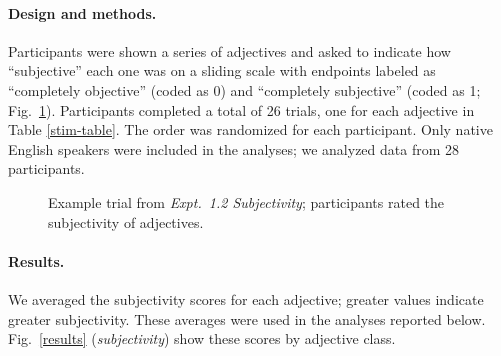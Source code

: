 \documentclass[12pt]{article}
\begin{document}
\paragraph{Design and methods.} Participants were shown a series of adjectives and asked to indicate how ``subjective'' each one was on a sliding scale with endpoints labeled as ``completely objective'' (coded as 0) and ``completely subjective'' (coded as 1; Fig.~\ref{subjectivity-trial}). 
Participants completed a total of 26 trials, one for each adjective in Table \ref{stim-table}. The order was randomized for each participant. Only native English speakers 
 were included in the analyses; we analyzed data from 28 participants.

\begin{figure}[tbh]
	\centering
	\caption{Example trial from \emph{Expt.\ 1.2 Subjectivity}; participants rated the subjectivity of adjectives.}\label{subjectivity-trial}
\end{figure}

\paragraph{Results.} We averaged the subjectivity scores for each adjective; greater values indicate greater subjectivity. These averages were used in the analyses reported below. Fig.\ \ref{results} (\emph{subjectivity}) show these scores by adjective class.
\end{document}
